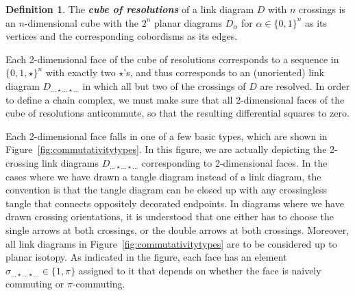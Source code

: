 \documentclass[12pt]{amsart}
\theoremstyle{definition}
\newtheorem{definition}{Definition}
\theoremstyle{plain}
\newcommand{\defw}[1]{{\bf{\textit{#1}}}}
\begin{document}
\begin{definition}
    The \defw{cube of resolutions} of a link diagram $D$ with $n$ crossings is an $n$-dimensional cube with the $2^n$ planar diagrams $D_\alpha$ for $\alpha\in\{0,1\}^n$ as its vertices and the corresponding cobordisms as its edges.
\end{definition}

Each 2-dimensional face of the cube of resolutions
corresponds to a sequence in $\{0,1,\star\}^n$ with exactly two $\star$'s, and thus
corresponds to an (unoriented) link diagram $D_{\dots{\star}\dots{\star}\dots}$
in which all but two of the crossings of $D$ are resolved.
In order to define a chain complex, we must make sure that all 2-dimensional
faces of the cube of resolutions anticommute, so that the
resulting differential squares to zero.

Each 2-dimensional face falls in one of a few basic types,
which are
shown in Figure~\ref{fig:commutativitytypes}.
In this figure, we are actually depicting the 2-crossing link diagrams $D_{\dots{\star}\dots{\star}\dots}$
corresponding to 2-dimensional faces. In the cases where we have
drawn a tangle diagram instead of a link diagram, the convention is that the tangle diagram
can be closed up with any crossingless tangle that connects
oppositely decorated endpoints.
In diagrams where we have drawn crossing orientations, it is understood
that one either has to choose the single arrows at both crossings, or the double arrows
at both crossings.
Moreover, all link diagrams in Figure~\ref{fig:commutativitytypes}
are to be considered up to planar isotopy.
As indicated in the figure, each face has an element $\sigma_{\dots{\star}\dots{\star}\dots}\in\{1,\pi\}$ assigned
to it that depends on whether the face is naively commuting or $\pi$-commuting.
\end{document}
